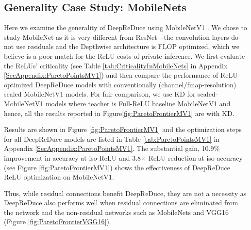 \subsection{Generality Case Study: MobileNets}
Here we examine the generality of DeepReDuce using MobileNetV1 \cite{howard2017mobilenets}.
We chose to study MobileNet as it is very different from ResNet---the convolution layers
do not use residuals and the Depthwise architecture is FLOP optimized, which we believe is a poor match for the ReLU costs of private inference.
We first evaluate the ReLUs' criticality (see Table \ref{tab:CriticalityInMobileNets} in Appendix \ref{SecAppendix:ParetoPointsMV1}) and then compare the performance of ReLU-optimized DeepReDuce models with conventionally (channel/fmap-resolution) scaled MobileNetV1 models. For fair comparison, we use KD for scaled-MobileNetV1 models where teacher is Full-ReLU baseline MobileNetV1 and hence, all the results reported in Figure\ref{fig:ParetoFrontierMV1} are with KD.  


Results are shown in Figure \ref{fig:ParetoFrontierMV1} and the optimization steps for all DeepReDuce models are listed in Table \ref{tab:ParetoPointsMV1} in Appendix \ref{SecAppendix:ParetoPointsMV1}. 
The substantial gain, 10.9\% improvement in accuracy at iso-ReLU and 3.8$\times$ ReLU reduction at iso-accuracy (see Figure \ref{fig:ParetoFrontierMV1}) shows the effectiveness of DeepReDuce ReLU optimization on MobileNetV1. 


Thus, while residual connections benefit DeepReDuce, they are not
a necessity as DeepReDuce also performs well when residual connections are eliminated from the network and the non-residual networks such as MobileNets and VGG16 (Figure \ref{fig:ParetoFrontierVGG16}).



